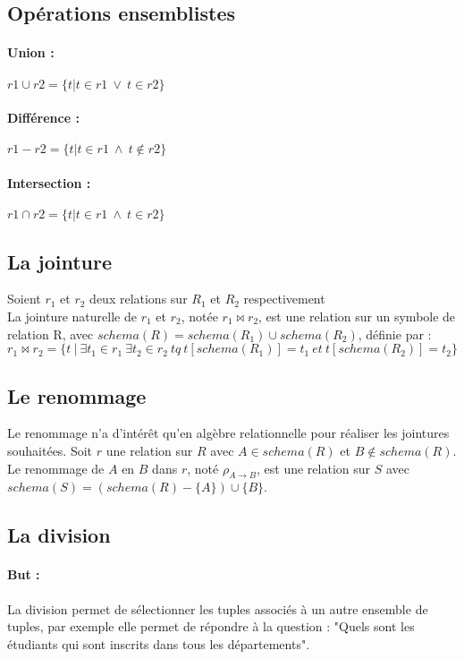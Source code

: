 \documentclass[10pt,a4paper]{article}
\begin{document}
\subsection{Opérations ensemblistes}
\paragraph*{Union :} $r1\cup r2 = \{t|t \in r1 \ \vee \  t \in r2 \}$
\paragraph*{Différence :} $r1 - r2 = \{t|t \in r1 \ \wedge \ t \notin r2 \}$
\paragraph*{Intersection :} $r1 \cap r2 = \{t|t \in r1 \ \wedge \ t \in r2 \}$

\subsection{La jointure}

Soient $r_{1}$ et $r_{2}$ deux relations sur $R_{1}$ et $R_{2}$ respectivement\\

La jointure naturelle de $r_{1}$ et $r_{2}$, notée $r_{1} \bowtie r_{2}$, est une relation sur un symbole de relation R, avec $schema(R) = schema(R_{1}) \cup schema(R_{2})$, définie par :
$$ r_{1} \bowtie r_{2} = \{t \ | \  \exists t_{1} \in r_{1} \ \exists t_{2} \in r_{2} \ tq \ t[schema(R_{1})]=t_{1} \  et \   t[schema(R_{2})]=t_{2} \}$$

\subsection{Le renommage}
Le renommage n'a d'intérêt qu'en algèbre relationnelle pour réaliser les jointures souhaitées. Soit $r$ une relation sur $R$ avec $A \in schema(R)$ et $B \notin schema(R)$. \\
Le renommage de $A$ en $B$ dans $r$, noté $\rho_{A \rightarrow B}$, est une relation sur $S$ avec $schema(S) = (schema(R) - \{A\}) \cup \{B\}$.

\subsection{La division}
\paragraph{But :} La division permet de sélectionner les tuples associés à un autre ensemble de tuples, par exemple elle permet de répondre à la question : "Quels sont les étudiants qui sont inscrits dans tous les départements".
\end{document}
